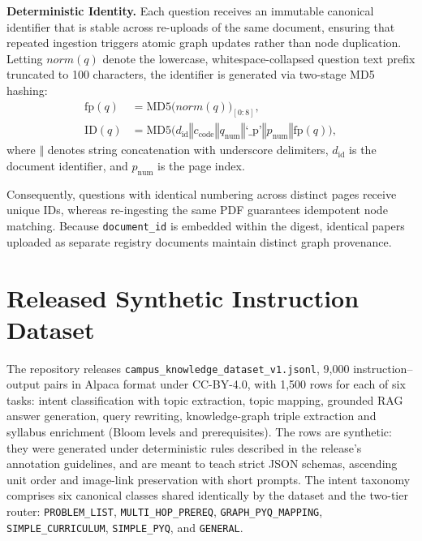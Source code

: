 \documentclass[conference]{IEEEtran}
\newcommand{\code}[1]{\texttt{\small #1}}
\begin{document}
\textbf{Deterministic Identity.} Each question receives an immutable canonical identifier that is stable across re-uploads of the same document, ensuring that repeated ingestion triggers atomic graph updates rather than node duplication. Letting $\mathit{norm}(q)$ denote the lowercase, whitespace-collapsed question text prefix truncated to 100 characters, the identifier is generated via two-stage MD5 hashing:
\begin{align}
\mathrm{fp}(q) &= \mathrm{MD5}\big(\mathit{norm}(q)\big)_{[0:8]}, \\
\mathrm{ID}(q) &= \mathrm{MD5}\big(d_{\mathrm{id}} \mathbin{\Vert} c_{\mathrm{code}} \mathbin{\Vert} q_{\mathrm{num}} \mathbin{\Vert} \text{`\_p'} \mathbin{\Vert} p_{\mathrm{num}} \mathbin{\Vert} \mathrm{fp}(q)\big),
\end{align}
where $\mathbin{\Vert}$ denotes string concatenation with underscore delimiters, $d_{\mathrm{id}}$ is the document identifier, and $p_{\mathrm{num}}$ is the page index. 

Consequently, questions with identical numbering across distinct pages receive unique IDs, whereas re-ingesting the same PDF guarantees idempotent node matching. Because \texttt{document\_id} is embedded within the digest, identical papers uploaded as separate registry documents maintain distinct graph provenance.


\section{Released Synthetic Instruction Dataset}\label{sec:dataset}
The repository releases \code{campus\_knowledge\_dataset\_v1.jsonl}, 9,000 instruction--output pairs in Alpaca format under CC-BY-4.0, with 1,500 rows for each of six tasks: intent classification with topic extraction, topic mapping, grounded RAG answer generation, query rewriting, knowledge-graph triple extraction and syllabus enrichment (Bloom levels and prerequisites). The rows are synthetic: they were generated under deterministic rules described in the release's annotation guidelines, and are meant to teach strict JSON schemas, ascending unit order and image-link preservation with short prompts. The intent taxonomy comprises six canonical classes shared identically by the dataset and the two-tier router: \code{PROBLEM\_\allowbreak LIST}, \code{MULTI\_\allowbreak HOP\_\allowbreak PREREQ}, \code{GRAPH\_\allowbreak PYQ\_\allowbreak MAPPING}, \code{SIMPLE\_\allowbreak CURRICULUM}, \code{SIMPLE\_\allowbreak PYQ}, and \code{GENERAL}.
\end{document}
